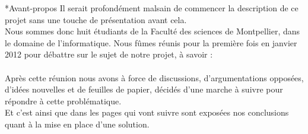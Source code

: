 \documentclass[a4paper, 12pt]{report}
\begin{document}
\begin{chapter}*{Avant-propos}
	Il serait profondément malsain de commencer la description de ce projet sans une touche de présentation avant cela.\\
	Nous sommes donc huit étudiants de la Faculté des sciences de Montpellier, dans le domaine de l'informatique.
	Nous fûmes réunis pour la première fois en janvier 2012 pour débattre sur le sujet de notre projet, à savoir :\\ 
	\\


    Après cette réunion nous avons à force de discussions, d'argumentations opposées, d'idées nouvelles et de feuilles de papier, décidés d'une 
    marche à suivre pour répondre à cette problématique.\\
    Et c'est ainsi que dans les pages qui vont suivre sont exposées nos conclusions quant à la mise en place d'une solution.	
\end{chapter}
\end{document}
